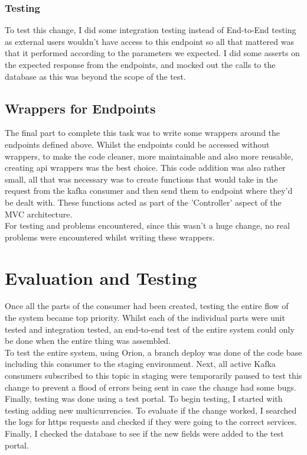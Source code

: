 \subsubsection{Testing}
To test this change, I did some integration testing instead of End-to-End testing as external users wouldn't have access to this endpoint so all that mattered was that it performed according to the parameters we expected. I did some asserts on the expected response from the endpoints, and mocked out the calls to the database as this was beyond the scope of the test. 


\subsection{Wrappers for Endpoints}
The final part to complete this task was to write some wrappers around the endpoints defined above.  Whilst the endpoints could be accessed without wrappers,  to make the code cleaner,  more maintainable and also more reusable,  creating api wrappers was the best choice.  \newline
This code addition was also rather small,  all that was necessary was to create functions that would take in the request from the kafka consumer and then send them to endpoint where they'd be dealt with.  These functions acted as part of the 'Controller' aspect of the MVC architecture.  \newline \\ For testing and problems encountered, since this wasn't a huge change, no real problems were encountered whilst writing these wrappers. 

\section{Evaluation and Testing}
Once all the parts of the consumer had been created,  testing the entire flow of the system became top priority.  Whilst each of the individual parts were unit tested and integration tested,  an end-to-end test of the entire system could only be done when the entire thing was assembled.  \newline \\ To test the entire system,  using Orion,  a branch deploy was done of the code base including this consumer to the staging environment.  Next,  all active Kafka consumers subscribed to this topic in staging were temporarily paused to test this change to prevent a flood of errors being sent in case the change had some bugs.  Finally,  testing was done using a test portal. \newline To begin testing,  I started with testing adding new multicurrencies.  To evaluate if the change worked,  I searched the logs for https requests and checked if they were going to the correct services.  Finally,  I checked the database to see if the new fields were added to the test portal.

